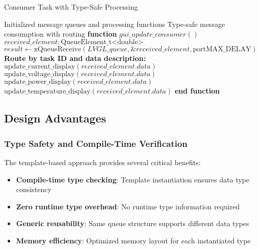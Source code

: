 \documentclass{article}
\begin{document}
\begin{algorithm}
\caption{Consumer Task with Type-Safe Processing}
\label{alg:consumer_task_pattern}
\begin{algorithmic}[1]
\REQUIRE Initialized message queues and processing functions
\ENSURE Type-safe message consumption with routing
\STATE \textbf{function} $gui\_update\_consumer()$
\STATE $received\_element: \text{QueueElement\_t<double>}$
    \STATE $result \leftarrow \text{xQueueReceive}(LVGL\_queue, \&received\_element, \text{portMAX\_DELAY})$
        \STATE \textbf{Route by task ID and data description:}
                \STATE $\text{update\_current\_display}(received\_element.data)$
                \STATE $\text{update\_voltage\_display}(received\_element.data)$
                \STATE $\text{update\_power\_display}(received\_element.data)$
            \ENDIF
            \STATE $\text{update\_temperature\_display}(received\_element.data)$
        \ENDIF
    \ENDIF
\ENDWHILE
\STATE \textbf{end function}
\end{algorithmic}
\end{algorithm}

\subsection{Design Advantages}

\subsubsection{Type Safety and Compile-Time Verification}

The template-based approach provides several critical benefits:

\begin{itemize}
    \item \textbf{Compile-time type checking}: Template instantiation ensures data type consistency
    \item \textbf{Zero runtime type overhead}: No runtime type information required
    \item \textbf{Generic reusability}: Same queue structure supports different data types
    \item \textbf{Memory efficiency}: Optimized memory layout for each instantiated type
\end{itemize}
\end{document}
